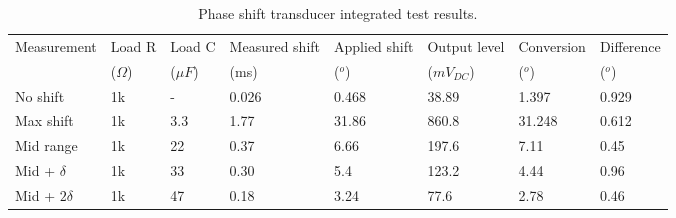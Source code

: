 \begin{table} [h!]
        \centering
        \scriptsize
        \caption{Phase shift transducer integrated test results.}
         \begin{tabular}{C{1.6cm} C{1.1cm} C{1.1cm} | C{2cm} C{1.8cm} C{1.8cm} C{1.5cm} C{1.5cm}}
           Measurement & Load R & Load C & Measured shift & Applied shift & Output level & Conversion & Difference\\
            & ($\Omega$) & ($\mu F$) & (ms) & ($^o$) & ($mV_{DC}$) & ($^o$) & ($^o$) \\
        \hline
            No shift      & 1k    & -   & 0.026 & 0.468 & 38.89  & 1.397  & 0.929 \\
            Max shift     & 1k    & 3.3 & 1.77 & 31.86 & 860.8  & 31.248  & 0.612 \\
            Mid range           & 1k    & 22  & 0.37& 6.66 & 197.6  & 7.11 & 0.45 \\
            Mid + $\delta$      & 1k    & 33 & 0.30 & 5.4 & 123.2 &4.44 & 0.96 \\
            Mid + $2\delta$     & 1k    & 47 & 0.18 & 3.24 & 77.6  & 2.78 & 0.46 \\
          \hline
        \end{tabular}
     \label{tab:phasetransducerrealtests}
\end{table}